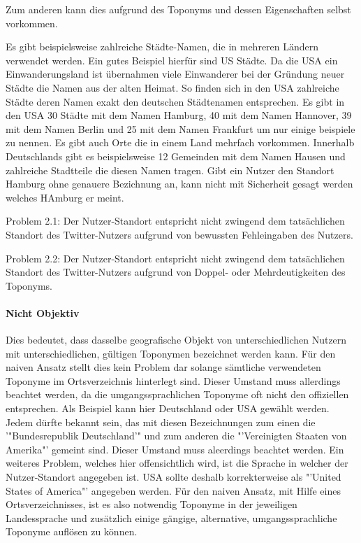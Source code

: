 				Zum anderen kann dies aufgrund des Toponyms und dessen Eigenschaften selbst vorkommen.

				Es gibt beispielsweise zahlreiche Städte-Namen, die in mehreren Ländern verwendet werden.
				Ein gutes Beispiel hierfür sind US Städte. 
				Da die USA ein Einwanderungsland ist übernahmen viele Einwanderer bei der Gründung neuer Städte die Namen aus der alten Heimat. 
				So finden sich in den USA zahlreiche Städte deren Namen exakt den deutschen Städtenamen entsprechen. 
				Es gibt in den USA 30 Städte mit dem Namen Hamburg, 40 mit dem Namen Hannover, 39 mit dem Namen Berlin und 25 mit dem Namen Frankfurt um nur einige beispiele zu nennen.
				Es gibt auch Orte die in einem Land mehrfach vorkommen.
				Innerhalb Deutschlands gibt es beispielsweise 12 Gemeinden mit dem Namen Hausen und zahlreiche Stadtteile die diesen Namen tragen.  
				Gibt ein Nutzer den Standort Hamburg ohne genauere Bezichnung an, kann nicht mit Sicherheit gesagt werden welches HAmburg er meint. 

				Problem 2.1: Der Nutzer-Standort entspricht nicht zwingend dem tatsächlichen Standort des Twitter-Nutzers aufgrund von bewussten Fehleingaben des Nutzers.
				
				Problem 2.2: Der Nutzer-Standort entspricht nicht zwingend dem tatsächlichen Standort des Twitter-Nutzers aufgrund von Doppel- oder Mehrdeutigkeiten des Toponyms.


			\paragraph{Nicht Objektiv} 

				Dies bedeutet, dass dasselbe geografische Objekt von unterschiedlichen Nutzern mit unterschiedlichen, gültigen Toponymen bezeichnet werden kann.
				Für den naiven Ansatz stellt dies kein Problem dar solange sämtliche verwendeten Toponyme im Ortsverzeichnis hinterlegt sind.  
				Dieser Umstand muss allerdings beachtet werden, da die umgangssprachlichen Toponyme oft nicht den offiziellen entsprechen. 
				Als Beispiel kann hier Deutschland oder USA gewählt werden. 
				Jedem dürfte bekannt sein, das mit diesen Bezeichnungen zum einen die '"Bundesrepublik Deutschland'" und zum anderen die "'Vereinigten Staaten von Amerika"' gemeint sind. 
				Dieser Umstand muss aleerdings beachtet werden.
				Ein weiteres Problem, welches hier offensichtlich wird, ist die Sprache in welcher der Nutzer-Standort angegeben ist. 
				USA sollte deshalb korrekterweise als "'United States of America"' angegeben werden.
				Für den naiven Ansatz, mit Hilfe eines Ortsverzeichnisses, ist es also notwendig Toponyme in der jeweiligen Landessprache und zusätzlich einige gängige, alternative, umgangssprachliche Toponyme auflösen zu können.  

